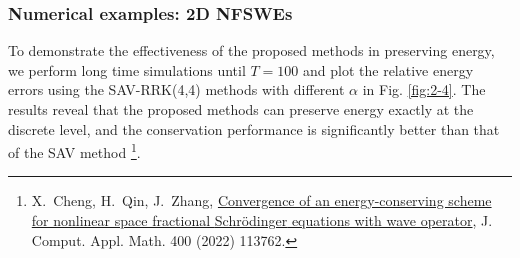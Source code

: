 \documentclass[aspectratio=169]{beamer}
\begin{document}
	\begin{frame}\frametitle{Numerical examples: 2D NFSWEs}
	To demonstrate the effectiveness of the proposed methods in preserving
	energy, we perform long time simulations until $T=100$ and plot the
	relative energy errors using the SAV-RRK(4,4) methods with different
	$\alpha$ in Fig. \ref{fig:2-4}. The results reveal that the proposed methods can preserve energy exactly at the discrete level, and the
	conservation performance is significantly better than that of the SAV
	method \footnote{\tiny 	X.~Cheng, H.~Qin, J.~Zhang,
	\href{https://linkinghub.elsevier.com/retrieve/pii/S0377042721003848}{Convergence
	of an energy-conserving scheme for nonlinear space fractional
	{{Schr\"odinger}} equations with wave operator}, J. Comput. Appl. Math. 400
	(2022) 113762.}.
	\end{frame}
	
\end{document}
